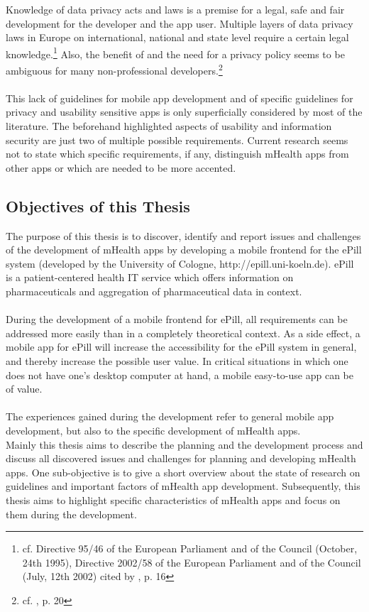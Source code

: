 Knowledge of data privacy acts and laws is a premise for a legal, safe and fair development for the developer and the app user. Multiple layers of data privacy laws in Europe on international, national and state level require a certain legal knowledge.\footnote{cf. Directive 95/46 of the European Parliament and of the Council (October, 24th 1995), Directive 2002/58 of the European Parliament and of the Council (July, 12th 2002) cited by \cite{FutureofPrivacyForumCenterforDemocracy&Technology.2011}, p. 16} Also, the benefit of and the need for a privacy policy seems to be ambiguous for many non-professional developers.\footnote{cf. \cite{Njie.2013}, p. 20}
\\
\\
This lack of guidelines for mobile app development and of specific guidelines for privacy and usability sensitive apps is only superficially considered by most of the literature. The beforehand highlighted aspects of usability and information security are just two of multiple possible requirements. Current research seems not to state which specific requirements, if any, distinguish mHealth apps from other apps or which are needed to be more accented.

\subsection{Objectives of this Thesis}
The purpose of this thesis is to discover, identify and report issues and challenges of the development of mHealth apps by developing a mobile frontend for the ePill system (developed by the University of Cologne, http://epill.uni-koeln.de). ePill is a patient-centered health IT service which offers information on pharmaceuticals and aggregation of pharmaceutical data in context.
\\
\\
During the development of a mobile frontend for ePill, all requirements can be addressed more easily than in a completely theoretical context. As a side effect, a mobile app for ePill will increase the accessibility for the ePill system in general, and thereby increase the possible user value. In critical situations in which one does not have one's desktop computer at hand, a mobile easy-to-use app can be of value.
\\
\\
The experiences gained during the development refer to general mobile app development, but also to the specific development of mHealth apps.
\\
Mainly this thesis aims to describe the planning and the development process and discuss all discovered issues and challenges for planning and developing mHealth apps. One sub-objective is to give a short overview about the state of research on guidelines and important factors of mHealth app development. Subsequently, this thesis aims to highlight specific characteristics of mHealth apps and focus on them during the development.